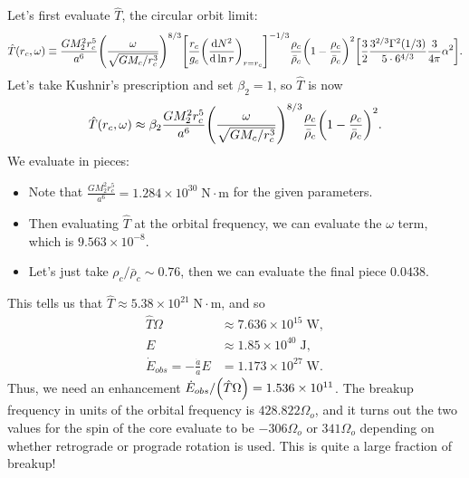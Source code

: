 \documentclass[11pt,
        usenames, %
        dvipsnames %
    ]{article}
\newcommand*{\scinot}[2]{#1\times10^{#2}}
\newcommand*{\rd}[2]{\frac{\mathrm{d}#1}{\mathrm{d}#2}}
\DeclarePairedDelimiter\p{\lparen}{\rparen}
\DeclarePairedDelimiter\s{\lbrack}{\rbrack}
\begin{document}
Let's first evaluate $\hat{T}$, the circular orbit limit:
\begin{equation}
    \hat{T}(r_c, \omega) \equiv \frac{GM_2^2r_c^5}{a^6}
        \p*{\frac{\omega}{\sqrt{GM_c/r_c^3}}}^{8/3}
        \s*{\frac{r_c}{g_c}\p*{\rd{N^2}{\ln r}}_{r = r_c}}^{-1/3}
            \frac{\rho_c}{\bar{\rho}_c} \p*{1 - \frac{\rho_c}{\bar{\rho}_c}}^2
            \s*{\frac{3}{2}\frac{3^{2/3}\Gamma^2(1/3)}{5 \cdot
                6^{4/3}} \frac{3}{4\pi}\alpha^2}.
\end{equation}
Let's take Kushnir's prescription and set $\beta_2 = 1$, so $\hat{T}$ is now
\begin{equation}
    \hat{T}(r_c, \omega) \approx \beta_2\frac{GM_2^2r_c^5}{a^6}
        \p*{\frac{\omega}{\sqrt{GM_c/r_c^3}}}^{8/3}
            \frac{\rho_c}{\bar{\rho}_c} \p*{1 - \frac{\rho_c}{\bar{\rho}_c}}^2.
\end{equation}
We evaluate in pieces:
\begin{itemize}
    \item Note that $\frac{GM_2^2 r_c^5}{a^6} = \scinot{1.284}{30}\;\mathrm{N
        \cdot m}$ for the given parameters.

    \item Then evaluating $\hat{T}$ at the orbital frequency, we can evaluate
        the $\omega$ term, which is $\scinot{9.563}{-8}$.

    \item Let's just take $\rho_c / \bar{\rho}_c \sim 0.76$, then we can evaluate
        the final piece $0.0438$.
\end{itemize}
This tells us that $\hat{T} \approx \scinot{5.38}{21}\;\mathrm{N \cdot m}$, and
so
\begin{align}
    \hat{T}\Omega &\approx \scinot{7.636}{15}\;\mathrm{W},\\
    E &\approx \scinot{1.85}{40}\;\mathrm{J},\\
    \dot{E}_{obs} = -\frac{\dot{a}}{a}E &= \scinot{1.173}{27}\;\mathrm{W}.
\end{align}
Thus, we need an enhancement $\dot{E}_{obs} / \p*{\hat{T}\Omega} =
\scinot{1.536}{11}$. The breakup frequency in units of the orbital frequency is
$428.822 \Omega_o$, and it turns out the two values for the spin of the core
evaluate to be $-306 \Omega_o$ or $341 \Omega_o$ depending on whether retrograde
or prograde rotation is used. This is quite a large fraction of breakup!
\end{document}
